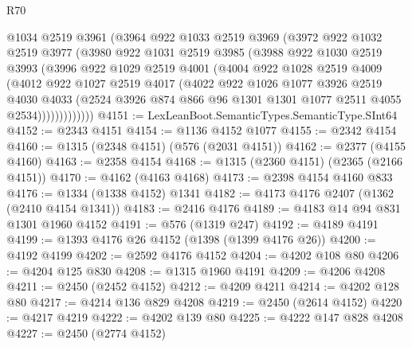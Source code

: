 \begin{lexlean}{R70}
\begin{coremodule}
            @1034
            @2519
            @3961
            (@3964
              @922
              @1033
              @2519
              @3969
              (@3972
                @922
                @1032
                @2519
                @3977
                (@3980
                  @922
                  @1031
                  @2519
                  @3985
                  (@3988
                    @922
                    @1030
                    @2519
                    @3993
                    (@3996
                      @922
                      @1029
                      @2519
                      @4001
                      (@4004
                        @922
                        @1028
                        @2519
                        @4009
                        (@4012
                          @922
                          @1027
                          @2519
                          @4017
                          (@4022
                            @922
                            @1026
                            @1077
                            @3926
                            @2519
                            @4030
                            @4033
                            (@2524
                              @3926
                              @874
                              @866
                              @96
                              @1301
                              @1301
                              @1077
                              @2511
                              @4055
                              @2534)))))))))))))
@4151 := LexLeanBoot.SemanticTypes.SemanticType.SInt64
@4152 := @2343 @4151
@4154 := @1136 @4152 @1077
@4155 := @2342 @4154
@4160 := @1315 (@2348 @4151) (@576 (@2031 @4151))
@4162 := @2377 (@4155 @4160)
@4163 := @2358 @4154
@4168 := @1315 (@2360 @4151) (@2365 (@2166 @4151))
@4170 := @4162 (@4163 @4168)
@4173 := @2398 @4154 @4160 @833
@4176 := @1334 (@1338 @4152) @1341
@4182 := @4173 @4176 @2407 (@1362 (@2410 @4154 @1341))
@4183 := @2416 @4176
@4189 := @4183 @14 @94 @831 @1301 @1960 @4152
@4191 := @576 (@1319 @247)
@4192 := @4189 @4191
@4199 := @1393 @4176 @26 @4152 (@1398 (@1399 @4176 @26))
@4200 := @4192 @4199
@4202 := @2592 @4176 @4152
@4204 := @4202 @108 @80
@4206 := @4204 @125 @830
@4208 := @1315 @1960 @4191
@4209 := @4206 @4208
@4211 := @2450 (@2452 @4152)
@4212 := @4209 @4211
@4214 := @4202 @128 @80
@4217 := @4214 @136 @829 @4208
@4219 := @2450 (@2614 @4152)
@4220 := @4217 @4219
@4222 := @4202 @139 @80
@4225 := @4222 @147 @828 @4208
@4227 := @2450 (@2774 @4152)

\end{coremodule}
\end{lexlean}
